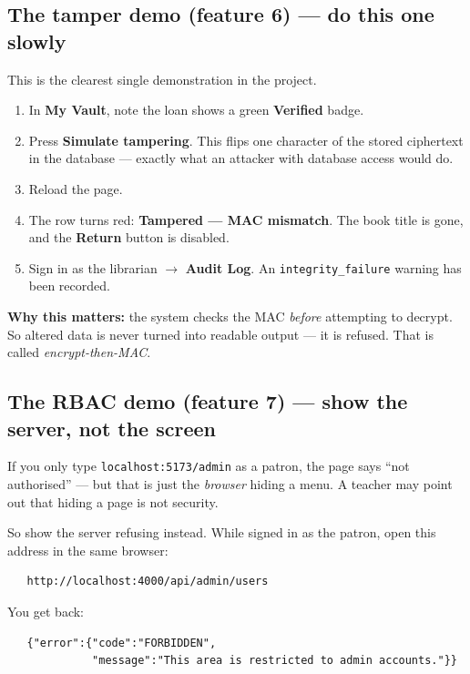 \documentclass[11pt]{article}
\begin{document}
\subsection*{The tamper demo (feature 6) --- do this one slowly}

This is the clearest single demonstration in the project.

\begin{enumerate}[leftmargin=1.4cm, itemsep=3pt]
  \item In \textbf{My Vault}, note the loan shows a green \textbf{Verified} badge.
  \item Press \textbf{Simulate tampering}. This flips one character of the
        stored ciphertext in the database --- exactly what an attacker with
        database access would do.
  \item Reload the page.
  \item The row turns red: \textbf{Tampered --- MAC mismatch}. The book title
        is gone, and the \textbf{Return} button is disabled.
  \item Sign in as the librarian $\rightarrow$ \textbf{Audit Log}. An
        \texttt{integrity\_failure} warning has been recorded.
\end{enumerate}

\textbf{Why this matters:} the system checks the MAC \emph{before} attempting
to decrypt. So altered data is never turned into readable output --- it is
refused. That is called \emph{encrypt-then-MAC}.

\subsection*{The RBAC demo (feature 7) --- show the server, not the screen}

If you only type \texttt{localhost:5173/admin} as a patron, the page says
``not authorised'' --- but that is just the \emph{browser} hiding a menu. A
teacher may point out that hiding a page is not security.

So show the server refusing instead. While signed in as the patron, open this
address in the same browser:

\begin{verbatim}
   http://localhost:4000/api/admin/users
\end{verbatim}

You get back:

\begin{verbatim}
   {"error":{"code":"FORBIDDEN",
             "message":"This area is restricted to admin accounts."}}
\end{verbatim}
\end{document}
